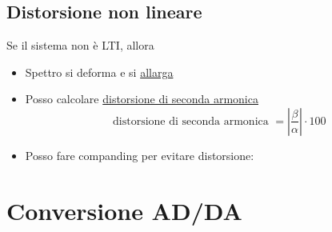 \subsection{Distorsione non lineare}
Se il sistema non è LTI, allora
\begin{itemize}
	\item Spettro si deforma e si \underline{allarga}
	\item Posso calcolare \underline{distorsione di seconda armonica}
	      \[
		      \text{ distorsione di seconda armonica } = \left|\frac{\beta }{\alpha }\right| \cdot 100
	      \]
	\item Posso fare companding per evitare distorsione:
	      \begin{center}
	      \end{center}

\end{itemize}
\section{Conversione AD/DA}
